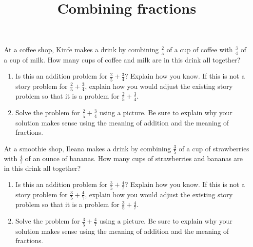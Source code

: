 \documentclass[nooutcomes,noauthor, handout]{ximera}
\title{Combining fractions}
\begin{document}
\begin{abstract}
\end{abstract}

\maketitle



\begin{problem}
At a coffee shop, Kinfe makes a drink by combining $\frac{2}{5}$ of a cup of coffee with $\frac{3}{4}$ of a cup of milk. How many cups of coffee and milk are in this drink all together?

\begin{enumerate}
	\item Is this an addition problem for $\frac{2}{5} + \frac{3}{4}$? Explain how you know.  If this is not a story problem for $\frac{2}{5} + \frac{3}{4}$, explain how you would adjust the existing story problem so that it is a problem for $\frac{2}{5} + \frac{3}{4}$.
	\item Solve the problem for $\frac{2}{5} + \frac{3}{4}$ using a picture. Be sure to explain why your solution makes sense using the meaning of addition and the meaning of fractions.
\end{enumerate}
\end{problem}



\begin{problem}
At a smoothie shop, Ileana makes a drink by combining $\frac{3}{5}$ of a cup of strawberries with $\frac{4}{7}$ of an ounce of bananas. How many cups of strawberries and bananas are in this drink all together?

\begin{enumerate}
	\item Is this an addition problem for $\frac{3}{5} + \frac{4}{7}$? Explain how you know.  If this is not a story problem for $\frac{3}{5} + \frac{4}{7}$, explain how you would adjust the existing story problem so that it is a problem for $\frac{3}{5} + \frac{4}{7}$.
	\item Solve the problem for $\frac{3}{5} + \frac{4}{7}$ using a picture. Be sure to explain why your solution makes sense using the meaning of addition and the meaning of fractions.
\end{enumerate}
\end{problem}
\end{document}
